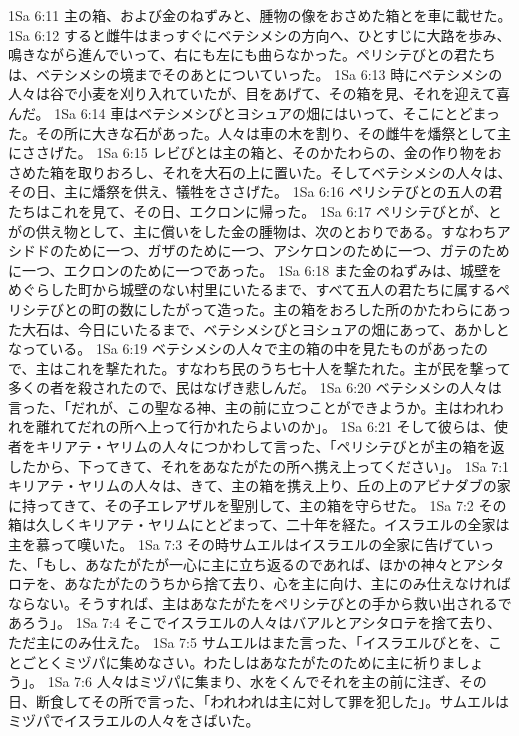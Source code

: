 1Sa 6:11  主の箱、および金のねずみと、腫物の像をおさめた箱とを車に載せた。
1Sa 6:12  すると雌牛はまっすぐにベテシメシの方向へ、ひとすじに大路を歩み、鳴きながら進んでいって、右にも左にも曲らなかった。ペリシテびとの君たちは、ベテシメシの境までそのあとについていった。
1Sa 6:13  時にベテシメシの人々は谷で小麦を刈り入れていたが、目をあげて、その箱を見、それを迎えて喜んだ。
1Sa 6:14  車はベテシメシびとヨシュアの畑にはいって、そこにとどまった。その所に大きな石があった。人々は車の木を割り、その雌牛を燔祭として主にささげた。
1Sa 6:15  レビびとは主の箱と、そのかたわらの、金の作り物をおさめた箱を取りおろし、それを大石の上に置いた。そしてベテシメシの人々は、その日、主に燔祭を供え、犠牲をささげた。
1Sa 6:16  ペリシテびとの五人の君たちはこれを見て、その日、エクロンに帰った。
1Sa 6:17  ペリシテびとが、とがの供え物として、主に償いをした金の腫物は、次のとおりである。すなわちアシドドのために一つ、ガザのために一つ、アシケロンのために一つ、ガテのために一つ、エクロンのために一つであった。
1Sa 6:18  また金のねずみは、城壁をめぐらした町から城壁のない村里にいたるまで、すべて五人の君たちに属するペリシテびとの町の数にしたがって造った。主の箱をおろした所のかたわらにあった大石は、今日にいたるまで、ベテシメシびとヨシュアの畑にあって、あかしとなっている。
1Sa 6:19  ベテシメシの人々で主の箱の中を見たものがあったので、主はこれを撃たれた。すなわち民のうち七十人を撃たれた。主が民を撃って多くの者を殺されたので、民はなげき悲しんだ。
1Sa 6:20  ベテシメシの人々は言った、「だれが、この聖なる神、主の前に立つことができようか。主はわれわれを離れてだれの所へ上って行かれたらよいのか」。
1Sa 6:21  そして彼らは、使者をキリアテ・ヤリムの人々につかわして言った、「ペリシテびとが主の箱を返したから、下ってきて、それをあなたがたの所へ携え上ってください」。
1Sa 7:1  キリアテ・ヤリムの人々は、きて、主の箱を携え上り、丘の上のアビナダブの家に持ってきて、その子エレアザルを聖別して、主の箱を守らせた。
1Sa 7:2  その箱は久しくキリアテ・ヤリムにとどまって、二十年を経た。イスラエルの全家は主を慕って嘆いた。
1Sa 7:3  その時サムエルはイスラエルの全家に告げていった、「もし、あなたがたが一心に主に立ち返るのであれば、ほかの神々とアシタロテを、あなたがたのうちから捨て去り、心を主に向け、主にのみ仕えなければならない。そうすれば、主はあなたがたをペリシテびとの手から救い出されるであろう」。
1Sa 7:4  そこでイスラエルの人々はバアルとアシタロテを捨て去り、ただ主にのみ仕えた。
1Sa 7:5  サムエルはまた言った、「イスラエルびとを、ことごとくミヅパに集めなさい。わたしはあなたがたのために主に祈りましょう」。
1Sa 7:6  人々はミヅパに集まり、水をくんでそれを主の前に注ぎ、その日、断食してその所で言った、「われわれは主に対して罪を犯した」。サムエルはミヅパでイスラエルの人々をさばいた。

